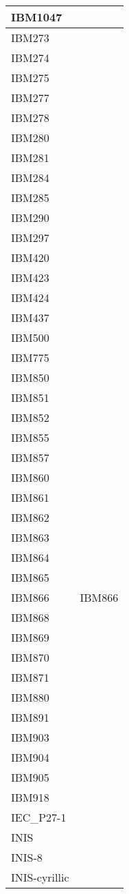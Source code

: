 \documentclass{wg21}
\begin{document}
\begin{longtable}{| p{} | p{} |}
IBM1047 & \\ \hline
IBM273 & \\ \hline
IBM274 & \\ \hline
IBM275 & \\ \hline
IBM277 & \\ \hline
IBM278 & \\ \hline
IBM280 & \\ \hline
IBM281 & \\ \hline
IBM284 & \\ \hline
IBM285 & \\ \hline
IBM290 & \\ \hline
IBM297 & \\ \hline
IBM420 & \\ \hline
IBM423 & \\ \hline
IBM424 & \\ \hline
IBM437 & \\ \hline
IBM500 & \\ \hline
IBM775 & \\ \hline
IBM850 & \\ \hline
IBM851 & \\ \hline
IBM852 & \\ \hline
IBM855 & \\ \hline
IBM857 & \\ \hline
IBM860 & \\ \hline
IBM861 & \\ \hline
IBM862 & \\ \hline
IBM863 & \\ \hline
IBM864 & \\ \hline
IBM865 & \\ \hline
IBM866 & IBM866\\ \hline
IBM868 & \\ \hline
IBM869 & \\ \hline
IBM870 & \\ \hline
IBM871 & \\ \hline
IBM880 & \\ \hline
IBM891 & \\ \hline
IBM903 & \\ \hline
IBM904 & \\ \hline
IBM905 & \\ \hline
IBM918 & \\ \hline
IEC_P27-1 & \\ \hline
INIS & \\ \hline
INIS-8 & \\ \hline
INIS-cyrillic & \\ \hline

\end{longtable}
\end{document}
